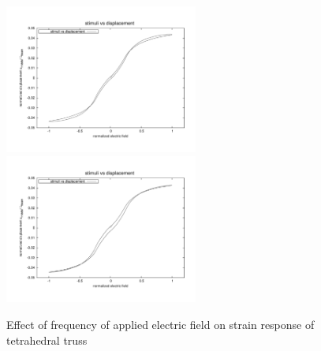 \begin{figure}
{\includegraphics[width=2.5in]{./chap_5_active_trusses/truss_freq_study/truss_nonlinear_freq_5p0.pdf}}
{\includegraphics[width=2.5in]{./chap_5_active_trusses/truss_freq_study/truss_nonlinear_freq_10p0.pdf}}
\caption{Effect of frequency of applied electric field on strain response of tetrahedral truss}
\label{fig:truss_linear_Frequency_Effect}
\end{figure}
 



\clearpage